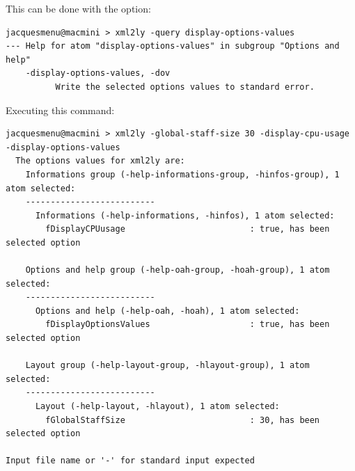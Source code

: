 This can be done with the  option:
\begin{lstlisting}[language=Terminal]
jacquesmenu@macmini > xml2ly -query display-options-values
--- Help for atom "display-options-values" in subgroup "Options and help"
    -display-options-values, -dov
          Write the selected options values to standard error.
\end{lstlisting}

Executing this command:
\begin{lstlisting}[language=Terminal]
jacquesmenu@macmini > xml2ly -global-staff-size 30 -display-cpu-usage -display-options-values
  The options values for xml2ly are:
    Informations group (-help-informations-group, -hinfos-group), 1 atom selected:
    --------------------------
      Informations (-help-informations, -hinfos), 1 atom selected:
        fDisplayCPUusage                         : true, has been selected option

    Options and help group (-help-oah-group, -hoah-group), 1 atom selected:
    --------------------------
      Options and help (-help-oah, -hoah), 1 atom selected:
        fDisplayOptionsValues                    : true, has been selected option

    Layout group (-help-layout-group, -hlayout-group), 1 atom selected:
    --------------------------
      Layout (-help-layout, -hlayout), 1 atom selected:
        fGlobalStaffSize                         : 30, has been selected option

Input file name or '-' for standard input expected
\end{lstlisting}

